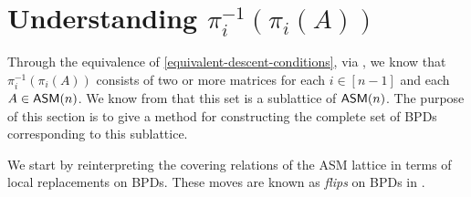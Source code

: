 \documentclass[12 pt]{amsart}
\numberwithin{equation}{section}
\theoremstyle{remark}
\newcommand{\asm}{{\sf ASM}}
\begin{document}
\section{Understanding $\pi_i^{-1}(\pi_i(A))$}



Through the equivalence of \cref{equivalent-descent-conditions}, via \cite[Lemma 6.2]{HR20}, we know that $\pi_i^{-1}(\pi_i(A))$ consists of two or more matrices for each $i \in [n-1]$ and each $A \in \asm(n)$. We know from \cite[Lemma 2.9]{EKW-main} that this set is a sublattice of $\asm(n)$.  The purpose of this section is to give a method for constructing the complete set of BPDs corresponding to this sublattice.

We start by reinterpreting the covering relations of the ASM lattice in terms of local replacements on BPDs.  These moves are known as \emph{flips} on BPDs in \cite{APP}.
\end{document}
